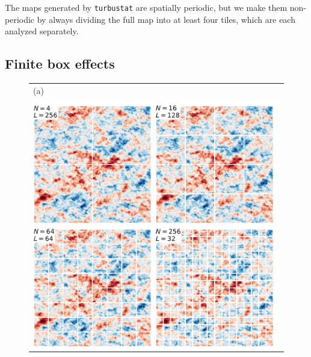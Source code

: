 \documentclass[fleqn,usenatbib, useAMS, a4paper]{mnras}
\begin{document}
The maps generated by \texttt{turbustat} are spatially periodic,
but we make them non-periodic by always dividing the full map into at least
four tiles, which are each analyzed separately. 

\subsection{\color{red}Finite box effects}
\label{sec:finite-box-effects}

\begin{figure}
  \begin{tabular}{@{} l @{}}
    (a)\\
    \includegraphics[width=\linewidth]{Figures/fake-3d-finite-box-images-ems-fluct_sigE_1}
    \\[\bigskipamount]

\end{tabular}
\end{figure}
\end{document}
